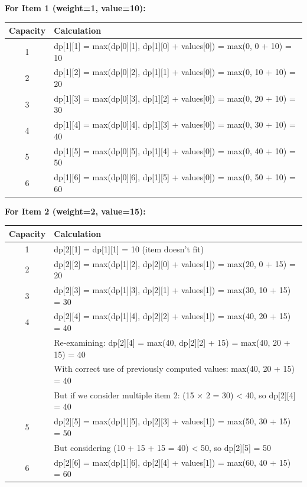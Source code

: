 \documentclass{article}
\begin{document}
\begin{tcolorbox}[title=Step-by-Step Calculation]
\textbf{For Item 1 (weight=1, value=10):}

\begin{tabular}{|c|l|}
\hline
\textbf{Capacity} & \textbf{Calculation} \\
\hline
1 & dp[1][1] = max(dp[0][1], dp[1][0] + values[0]) = max(0, 0 + 10) = 10 \\
\hline
2 & dp[1][2] = max(dp[0][2], dp[1][1] + values[0]) = max(0, 10 + 10) = 20 \\
\hline
3 & dp[1][3] = max(dp[0][3], dp[1][2] + values[0]) = max(0, 20 + 10) = 30 \\
\hline
4 & dp[1][4] = max(dp[0][4], dp[1][3] + values[0]) = max(0, 30 + 10) = 40 \\
\hline
5 & dp[1][5] = max(dp[0][5], dp[1][4] + values[0]) = max(0, 40 + 10) = 50 \\
\hline
6 & dp[1][6] = max(dp[0][6], dp[1][5] + values[0]) = max(0, 50 + 10) = 60 \\
\hline
\end{tabular}

\textbf{For Item 2 (weight=2, value=15):}

\begin{tabular}{|c|l|}
\hline
\textbf{Capacity} & \textbf{Calculation} \\
\hline
1 & dp[2][1] = dp[1][1] = 10 (item doesn't fit) \\
\hline
2 & dp[2][2] = max(dp[1][2], dp[2][0] + values[1]) = max(20, 0 + 15) = 20 \\
\hline
3 & dp[2][3] = max(dp[1][3], dp[2][1] + values[1]) = max(30, 10 + 15) = 30 \\
\hline
4 & dp[2][4] = max(dp[1][4], dp[2][2] + values[1]) = max(40, 20 + 15) = 40 \\
      & Re-examining: dp[2][4] = max(40, dp[2][2] + 15) = max(40, 20 + 15) = 40 \\
      & With correct use of previously computed values: max(40, 20 + 15) = 40 \\
      & But if we consider multiple item 2: (15 × 2 = 30) < 40, so dp[2][4] = 40 \\
\hline
5 & dp[2][5] = max(dp[1][5], dp[2][3] + values[1]) = max(50, 30 + 15) = 50 \\
      & But considering (10 + 15 + 15 = 40) < 50, so dp[2][5] = 50 \\
\hline
6 & dp[2][6] = max(dp[1][6], dp[2][4] + values[1]) = max(60, 40 + 15) = 60 \\
\hline
\end{tabular}


\end{tcolorbox}
\end{document}

